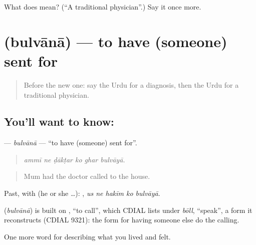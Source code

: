 \begin{tcolorbox}[breakable,colback=teal!4,colframe=teal!35!black,title={Before you move on}]
What does  mean? (\textquotedblleft{}A traditional physician\textquotedblright{}.) Say it once more.
\end{tcolorbox}
\section[\texorpdfstring{\ur{بلوانا} (bulvānā)}{بلوانا (bulvānā)}]{ (bulvānā) — to have (someone) sent for}

\label{lesson:UR-C476-bulvana}



\begin{quote}
Before the new one: say the Urdu for a diagnosis, then the Urdu for a traditional physician.
\end{quote}

\subsection*{You'll want to know: }
\textbf{} — \emph{bulvānā} — \textquotedblleft{}to have (someone) sent for\textquotedblright{}.

\begin{quote}
     
\end{quote}

\begin{quote}
\emph{ammī ne ḍākṭar ko ghar bulvāyā.}
\end{quote}

\begin{quote}
Mum had the doctor called to the house.
\end{quote}

Past, with  (he or she …):     , \emph{us ne hakīm ko bulvāyā}.

\begin{cousinweb}
\textbf{} (\emph{bulvānā}) is built on \textbf{}, \textquotedblleft{}to call\textquotedblright{}, which CDIAL lists under \emph{bōll}, \textquotedblleft{}speak\textquotedblright{}, a form it reconstructs (CDIAL 9321): the form for having someone else do the calling.
\end{cousinweb}

\begin{grammarlens}[title={What you've built}]
One more word for describing what you lived and felt.
\end{grammarlens}

